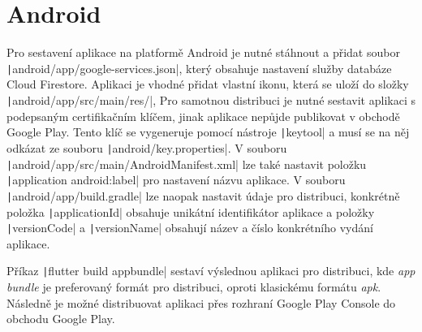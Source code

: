\section{Android}

Pro sestavení aplikace na platformě Android je nutné stáhnout a přidat soubor
\texttt|android/app/google-services.json|,
který obsahuje nastavení služby databáze Cloud Firestore.
Aplikaci je vhodné přidat vlastní ikonu,
která se uloží do složky \texttt|android/app/src/main/res/|,
Pro samotnou distribuci je nutné sestavit aplikaci
s podepsaným certifikačním klíčem,
jinak aplikace nepůjde publikovat v obchodě Google Play. 
Tento klíč se vygeneruje pomocí nástroje \texttt|keytool|
a musí se na něj odkázat ze souboru \texttt|android/key.properties|.
V souboru
\texttt|android/app/src/main/AndroidManifest.xml|
lze také nastavit položku
\texttt|application android:label|
pro nastavení názvu aplikace.
V souboru
\texttt|android/app/build.gradle|
lze naopak nastavit údaje pro distribuci,
konkrétně položka \texttt|applicationId|
obsahuje unikátní identifikátor aplikace
a položky \texttt|versionCode| a \texttt|versionName|
obsahují název a číslo konkrétního vydání aplikace.
\cite{flutter_deploy_android}

Příkaz \texttt|flutter build appbundle| sestaví výslednou aplikaci
pro distribuci,
kde \emph{app bundle} je preferovaný formát pro distribuci,
oproti klasickému formátu \emph{apk}.
Následně je možné distribuovat aplikaci přes rozhraní Google Play Console
do obchodu Google Play.
